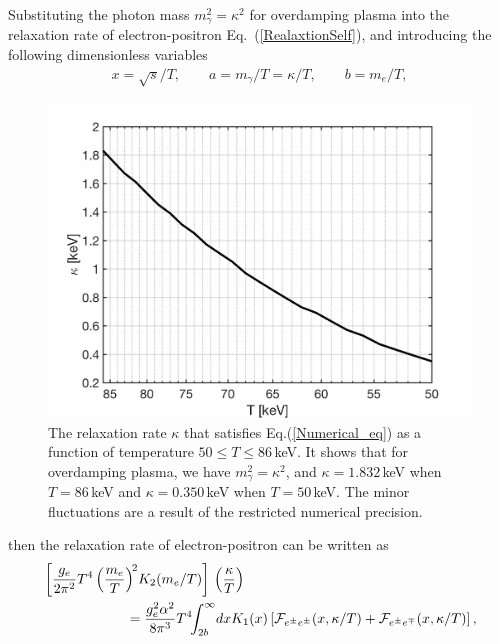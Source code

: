 Substituting the photon mass $m^2_\gamma=\kappa^2$ for overdamping plasma into the relaxation rate of electron-positron Eq.~(\ref{RealaxtionSelf}), and introducing the following dimensionless variables
\begin{align}
x=\sqrt{s}/T,\qquad a=m_\gamma/T=\kappa/T,\qquad b=m_e/T,
\end{align}
\begin{figure}[ht]
\centering
\includegraphics[width=\linewidth]{./plots/OverdampingKappa.jpg}
\caption{The relaxation rate $\kappa$ that satisfies Eq.(\ref{Numerical_eq}) as a function of temperature $50\leqslant T\leqslant 86$\,keV. It shows that for overdamping plasma, we have $m^2_\gamma=\kappa^2$, and $\kappa=1.832$\,keV when $T=86$\,keV and $\kappa=0.350$\,keV when $T=50$\,keV. The minor fluctuations are a result of the restricted numerical precision.}
\label{KappaSol.fig} 
\end{figure}
then the relaxation rate of electron-positron can be written as
\begin{align}\label{Numerical_eq}
&\left[\frac{g_e}{2\pi^2}T^4\left(\frac{m_e}{T}\right)^{\!2}\!K_2(m_e/T)\right]\,\left(\frac{\kappa}{T}\right)\notag\\
&\qquad\qquad\qquad=\frac{g^2_e\alpha^2}{8\pi^3}T^4\!\!\int_{2b}^\infty\!dxK_1(x)\left[\mathcal{F}_{e^\pm e^\pm}(x,\kappa/T)+\mathcal{F}_{e^\pm e^\mp}(x,\kappa/T)\right],
\end{align}
